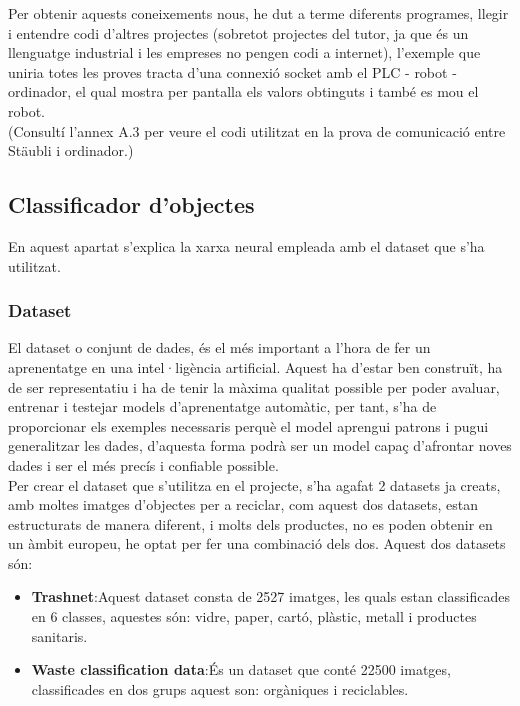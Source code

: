 ﻿\documentclass[10pt,a4paper,twocolumn,twoside]{article}
\begin{document}
Per obtenir aquests coneixements nous, he dut a terme diferents programes, llegir i entendre codi d'altres projectes (sobretot projectes del tutor, ja que és un llenguatge industrial i les empreses no pengen codi a internet), l'exemple que uniria totes les proves tracta d'una connexió socket amb el PLC - robot - ordinador, el qual mostra per pantalla els valors obtinguts i també es mou el robot.
\\
 \hfill \break
(Consultí l’annex A.3 per veure el codi utilitzat en la prova de comunicació entre Stäubli i ordinador.)
 
\subsection{Classificador d'objectes}

En aquest apartat s'explica la xarxa neural empleada amb el dataset que s'ha utilitzat.

\subsubsection{Dataset}

El dataset o conjunt de dades, és el més important a l'hora de fer un aprenentatge en una intel·ligència artificial. Aquest ha d'estar ben construït, ha de ser representatiu i ha de tenir la màxima qualitat possible per poder avaluar, entrenar i testejar models d'aprenentatge automàtic, per tant, s'ha de proporcionar els exemples necessaris perquè el model aprengui patrons i pugui generalitzar les dades, d'aquesta forma podrà ser un model capaç d'afrontar noves dades i ser el més precís i confiable possible.
\\

Per crear el dataset que s'utilitza en el projecte, s'ha agafat 2 datasets ja creats, amb moltes imatges d'objectes per a reciclar, com aquest dos datasets, estan estructurats de manera diferent, i molts dels productes, no es poden obtenir en un àmbit europeu, he optat per fer una combinació dels dos. Aquest dos datasets són:

 \begin{itemize}
      \item \textbf{Trashnet}\cite{trashnet}:Aquest dataset consta de 2527 imatges, les quals estan classificades en 6 classes, aquestes són: vidre, paper, cartó, plàstic, metall i productes sanitaris.
      \item \textbf{Waste classification data}\cite{waste-classification-data}:És un dataset que conté 22500 imatges, classificades en dos grups aquest son: orgàniques i reciclables.
   \end{itemize}
\end{document}
